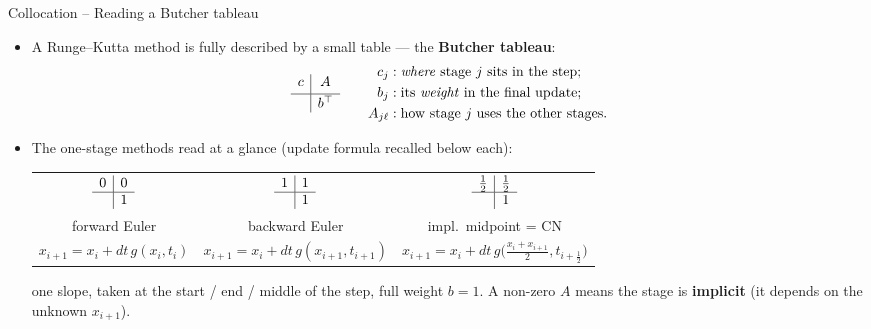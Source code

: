 \documentclass[11pt,aspectratio=169]{beamer}
\begin{document}
\begin{frame}{Collocation -- Reading a Butcher tableau}

\begin{itemize}

\item A Runge--Kutta method is fully described by a small table — the
  \textbf{Butcher tableau}:
  \[
  \begin{array}{c|c} c & A \\[2pt] \hline \rule{0pt}{2.2ex} & b^\top \end{array}
  \qquad
  \begin{aligned}
  c_j &: \text{\emph{where} stage } j \text{ sits in the step};\\
  b_j &: \text{its \emph{weight} in the final update};\\
  A_{j\ell} &: \text{how stage } j \text{ uses the other stages.}
  \end{aligned}
  \]

\item The one-stage methods read at a glance (update formula recalled
  below each):
  \begin{center}
    \renewcommand{\arraystretch}{1.1}
    \begin{tabular}{ccc}
      $\begin{array}{c|c} 0 & 0 \\ \hline & 1 \end{array}$ &
      $\begin{array}{c|c} 1 & 1 \\ \hline & 1 \end{array}$ &
      $\begin{array}{c|c} \tfrac12 & \tfrac12 \\ \hline & 1 \end{array}$ \\[3pt]
      forward Euler & backward Euler & impl.\ midpoint = CN \\[1pt]
      {\scriptsize $x_{i+1}=x_i+dt\,g(x_i,t_i)$} &
      {\scriptsize $x_{i+1}=x_i+dt\,g(x_{i+1},t_{i+1})$} &
      {\scriptsize $x_{i+1}=x_i+dt\,g\!\bigl(\tfrac{x_i+x_{i+1}}{2},t_{i+\frac12}\bigr)$} \\
    \end{tabular}
  \end{center}
  one slope, taken at the start / end / middle of the step, full weight
  $b=1$. A non-zero $A$ means the stage is \textbf{implicit} (it depends
  on the unknown $x_{i+1}$).

\end{itemize}

\end{frame}
\end{document}

